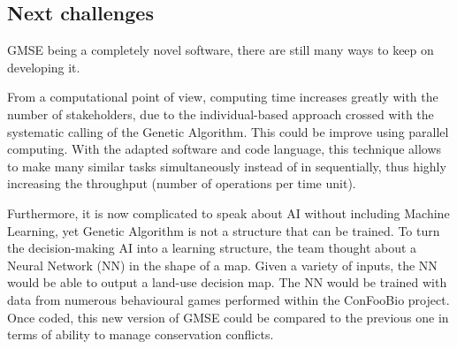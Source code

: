 \documentclass[12pt,a4paper]{article}
\begin{document}
\subsection{Next challenges}

GMSE being a completely novel software, there are still many ways to keep on developing it.

From a computational point of view, computing time increases greatly with the number of stakeholders, due to the individual-based approach crossed with the systematic calling of the Genetic Algorithm.
This could be improve using parallel computing.
With the adapted software and code language, this technique allows to make many similar tasks simultaneously instead of in sequentially, thus highly increasing the throughput (number of operations per time unit).

Furthermore, it is now complicated to speak about AI without including Machine Learning, yet Genetic Algorithm is not a structure that can be trained.
To turn the decision-making AI into a learning structure, the team thought about a Neural Network (NN) in the shape of a map.
Given a variety of inputs, the NN would be able to output a land-use decision map.
The NN would be trained with data from numerous behavioural games performed within the ConFooBio project.
Once coded, this new version of GMSE could be compared to the previous one in terms of ability to manage conservation conflicts.
%

\newpage

\nocite{*}
\end{document}
